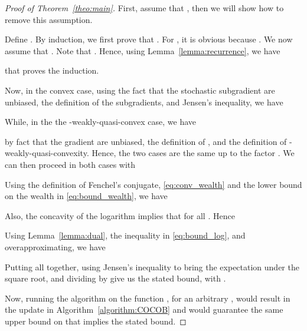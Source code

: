 \documentclass{article}
\begin{document}
\begin{proof}[Proof of Theorem~\ref{theo:main}]
First, assume that , then we will show how to remove this assumption.

Define .
By induction, we first prove that . For , it is obvious because . We now assume that . Note that .
Hence, using Lemma~\ref{lemma:recurrence}, we have

that proves the induction.

Now, in the convex case, using the fact that the stochastic subgradient are unbiased, the definition of the subgradients, and Jensen's inequality, we have


While, in the the -weakly-quasi-convex case, we have

by fact that the gradient are unbiased, the definition of , and the definition of -weakly-quasi-convexity.
Hence, the two cases are the same up to the factor . We can then proceed in both cases with


Using the definition of Fenchel's conjugate, \eqref{eq:conv_wealth} and the lower bound on the wealth in \eqref{eq:bound_wealth}, we have


Also, the concavity of the logarithm implies that  for all . Hence


Using Lemma~\ref{lemma:dual}, the inequality in \eqref{eq:bound_log}, and overapproximating, we have


Putting all together, using Jensen's inequality to bring the expectation under the square root, and dividing by  give us the stated bound, with .

Now, running the algorithm on the function , for an arbitrary , would result in the update in Algorithm~\ref{algorithm:COCOB} and would guarantee the same upper bound on  that implies the stated bound.
\end{proof}

 
\end{document}
